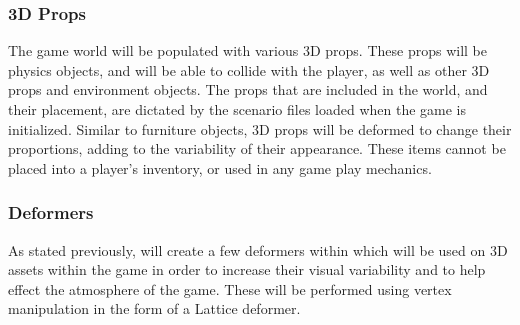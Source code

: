 \subsubsection{3D Props}
The game world will be populated with various 3D props. These props will be physics objects, and will be able to collide with the player, as well as other 3D props and environment objects. The props that are included in the world, and their placement, are dictated by the scenario files loaded when the game is initialized. Similar to furniture objects, 3D props will be deformed to change their proportions, adding to the variability of their appearance. These items cannot be placed into a player's inventory, or used in any game play mechanics.

\subsubsection{Deformers}
As stated previously, \ourteam{} will create a few deformers within \ourengine{} which will be used on 3D assets within the game in order to increase their visual variability and to help effect the atmosphere of the game. These will be performed using vertex manipulation in the form of a Lattice deformer.